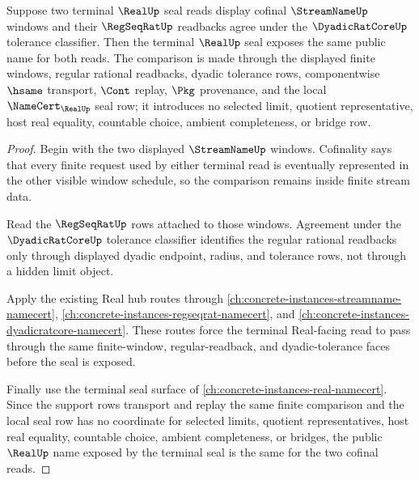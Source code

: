 \begin{theorem}
\label{thm:real-cofinal-window-transport}
Suppose two terminal $\RealUp$ seal reads display cofinal $\StreamNameUp$ windows and their $\RegSeqRatUp$ readbacks agree under the $\DyadicRatCoreUp$ tolerance classifier. Then the terminal $\RealUp$ seal exposes the same public name for both reads. The comparison is made through the displayed finite windows, regular rational readbacks, dyadic tolerance rows, componentwise $\hsame$ transport, $\Cont$ replay, $\Pkg$ provenance, and the local $\NameCert_{\RealUp}$ seal row; it introduces no selected limit, quotient representative, host real equality, countable choice, ambient completeness, or bridge row.
\end{theorem}
\begin{proof}
Begin with the two displayed $\StreamNameUp$ windows. Cofinality says that every finite request used by either terminal read is eventually represented in the other visible window schedule, so the comparison remains inside finite stream data.

Read the $\RegSeqRatUp$ rows attached to those windows. Agreement under the $\DyadicRatCoreUp$ tolerance classifier identifies the regular rational readbacks only through displayed dyadic endpoint, radius, and tolerance rows, not through a hidden limit object.

Apply the existing Real hub routes through \autoref{ch:concrete-instances-streamname-namecert}, \autoref{ch:concrete-instances-regseqrat-namecert}, and \autoref{ch:concrete-instances-dyadicratcore-namecert}. These routes force the terminal Real-facing read to pass through the same finite-window, regular-readback, and dyadic-tolerance faces before the seal is exposed.

Finally use the terminal seal surface of \autoref{ch:concrete-instances-real-namecert}. Since the support rows transport and replay the same finite comparison and the local seal row has no coordinate for selected limits, quotient representatives, host real equality, countable choice, ambient completeness, or bridges, the public $\RealUp$ name exposed by the terminal seal is the same for the two cofinal reads.
\end{proof}

